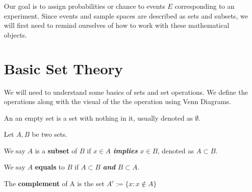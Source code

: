 Our goal is to assign probabilities or chance to events $E$ corresponding to an experiment. Since events and sample spaces are described as sets and subsets, we will first need to remind ourselves of how to work with these mathematical objects.  

\section[Set Theory]{Basic Set Theory}
We will need to understand some basics of sets and set operations. We define the operations along with the visual of the the operation using Venn Diagrams.

\begin{defn}
    An an empty set is a set with nothing in it, usually denoted as $\emptyset$.
\end{defn}

Let $A,B$ be two sets.\\
\begin{defn}
    We say $A$ is a \textbf{subset} of $B$ if \textit{$x\in A$ \textbf{implies} $x\in B$}, denoted as $A\subset B$.\\
\end{defn}

\begin{defn}[Equality]
    We say $A$ \textbf{equals} to $B$ if \textit{$A\subset B$ \textbf{and} $B\subset A$}.  
\end{defn}

\begin{defn}[Complement]
    The \textbf{complement} of A is the set $A^c:=\{x:x\notin A\}$
    \begin{center}
\end{center}
\end{defn}

